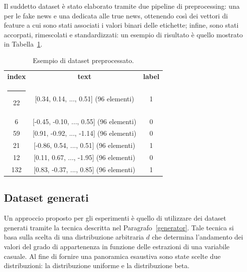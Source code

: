 \documentclass[12pt]{report}
\makeatletter
\theoremstyle{definition}
\newcommand{\thickhline}{%
    \noalign {\ifnum 0=`}\fi \hrule height 1pt
    \futurelet \reserved@a \@xhline
}
\makeatother
\begin{document}
Il suddetto dataset è stato elaborato tramite due pipeline di preprocessing: una per le fake news e una dedicata alle true news, ottenendo così dei vettori di feature a cui sono stati associati i valori binari delle etichette; infine, sono stati accorpati, rimescolati e standardizzati: un esempio di risultato è quello mostrato in Tabella~\ref{preprocesseddata}.
\begin{table}
\centering
 \begin{tabular}{|c|c|c|} 
 \hline 
 \textbf{index} & \textbf{text} & \textbf{label}
\\ [0.5ex] 
 \thickhline
22 & [0.34, 0.14, ..., 0.51] (96 elementi) & 1 \\
6 & [-0.45, -0.10, ..., 0.55] (96 elementi) & 0 \\ 
59 & [0.91, -0.92, ..., -1.14] (96 elementi) & 0\\
21 & [-0.86, 0.54, ..., 0.51] (96 elementi) & 1\\
12 & [0.11, 0.67, ..., -1.95] (96 elementi) & 0\\
132 & [0.83, -0.37, ..., 0.85] (96 elementi) & 1\\
 \hline
\end{tabular}
\caption{Esempio di dataset preprocessato.}
\label{preprocesseddata}
\end{table}

\subsection{Dataset generati}\label{generated_datasets}
Un approccio proposto per gli esperimenti è quello di utilizzare dei dataset generati tramite la tecnica descritta nel Paragrafo~\ref{generator}. Tale tecnica si basa sulla scelta di una distribuzione arbitraria $d$ che determina l'andamento dei valori del grado di appartenenza in funzione delle estrazioni di una variabile casuale. Al fine di fornire una panoramica esaustiva sono state scelte due distribuzioni: la distribuzione uniforme e la distribuzione beta.
\end{document}
